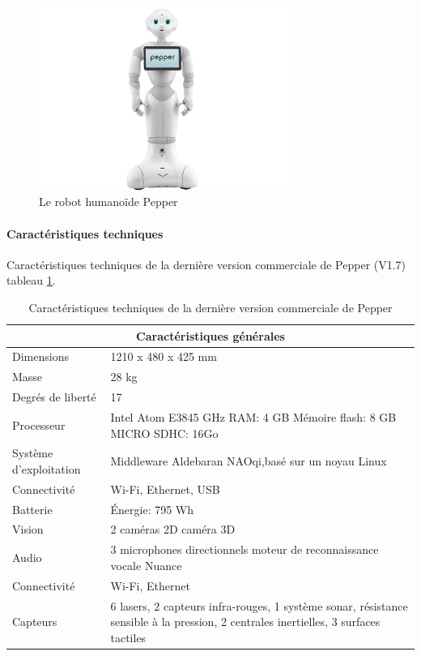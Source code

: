\begin{figure}[H]
	\centering\includegraphics[height=6cm]{images/pepper.jpg}
	\caption{Le robot humanoïde Pepper}
	\label{fig:Robot humanoïde Pepper}
\end{figure}

\paragraph{Caractéristiques techniques}
Caractéristiques techniques de la dernière version commerciale de Pepper (V1.7) tableau \ref{tab: Caractéristiques techniques de Pepper}.

\begin{table}[H]
\begin{tabular}{ | l | p{10cm} | }
	\hline
	\multicolumn{2}{|c|}{Caractéristiques générales} \\
	\hline
	Dimensions & 1210 x 480 x 425 mm \\
	\hline 
	Masse & 28 kg \\
	\hline 
	Degrés de liberté  & 17 \\
	\hline
	Processeur & Intel Atom E3845 \newline 1.91 GHz \newline RAM: 4 GB \newline Mémoire flash: 8 GB \newline MICRO SDHC: 16Go  \\
	\hline
	Système d'exploitation & Middleware Aldebaran NAOqi,\newline basé sur un noyau Linux \\
	\hline
	Connectivité & Wi-Fi, Ethernet, USB \\
	\hline
	Batterie & Énergie: 795 Wh \\
	\hline 
	Vision & 2 caméras 2D \newline 1 caméra 3D \\
	\hline
	Audio & 3 microphones directionnels \newline moteur de reconnaissance vocale Nuance  \\
	\hline
	Connectivité & Wi-Fi, Ethernet \\
	\hline
	Capteurs & 6 lasers, 2 capteurs infra-rouges, 1 système sonar, résistance sensible à la pression, 2 centrales inertielles, 3 surfaces tactiles \\
	\hline
\end{tabular}
\caption[Caractéristiques techniques de Pepper]{Caractéristiques techniques de la dernière version commerciale  de Pepper}
\label {tab: Caractéristiques techniques de Pepper}
\cite{PepperTech}
\end{table}

